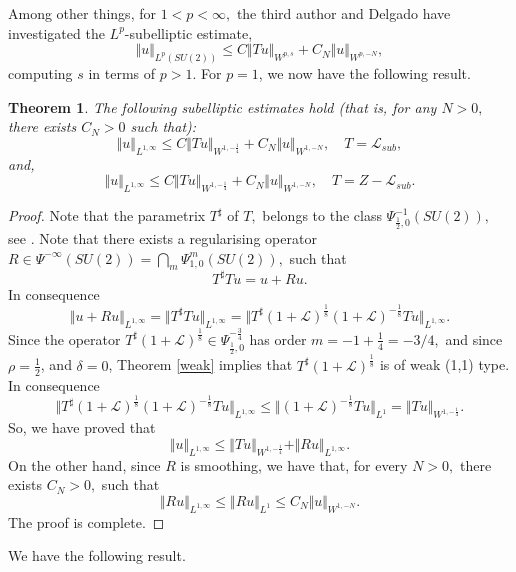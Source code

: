 \documentclass[12pt, reqno]{amsart}
\newtheorem{theorem}{Theorem}[section]
\theoremstyle{definition}
\theoremstyle{remark}
\numberwithin{equation}{section}
\begin{document}
Among other things, for $1<p<\infty,$ the third author and Delgado have investigated  the $L^p$-subelliptic estimate,
\begin{equation}\label{subellipticLp}
    \Vert u\Vert_{L^{p}(SU(2))}\leq C \Vert Tu\Vert_{W^{p,s}}+C_N\Vert u\Vert_{W^{p,-N}},
\end{equation} computing $s$ in terms of $p>1.$ For $p=1$,
 we now have the following result.
\begin{theorem}\label{application}The following subelliptic estimates hold (that is, for any $N>0,$ there exists $C_N>0$ such that):
\begin{equation}
    \Vert u\Vert_{L^{1,\infty}}\leq C \Vert Tu\Vert_{W^{1,-\frac{1}{4}}}+C_N\Vert u\Vert_{W^{1,-N}},\quad  T=\mathcal{L}_{sub},
\end{equation} and,
\begin{equation}
    \Vert u\Vert_{L^{1,\infty}}\leq C \Vert Tu\Vert_{W^{1,-\frac{1}{4}}}+C_N\Vert u\Vert_{W^{1,-N}},\quad  T=Z-\mathcal{L}_{sub}.
\end{equation}
    
\end{theorem}
\begin{proof}
   Note that the parametrix $T^\sharp$ of $T,$ belongs to the class $\Psi^{-1}_{\frac{1}{2},0}(SU(2)),$ see \cite{19}. Note that there exists a regularising operator $R\in \Psi^{-\infty}(SU(2))=\bigcap_m \Psi^{m}_{1,0}(SU(2)),$ such that 
    \begin{equation}
        T^\sharp T u =u+Ru.
    \end{equation} In consequence
    \begin{equation}
        \Vert u+Ru\Vert_{L^{1,\infty}} =\Vert T^\sharp T u\Vert_{L^{1,\infty}}
        = \Vert T^\sharp(1+\mathcal{L})^{\frac{1}{8}} (1+\mathcal{L})^{-\frac{1}{8}}Tu\Vert_{L^{1,\infty}}.
    \end{equation} Since the operator $T^\sharp(1+\mathcal{L})^{  \frac{1}{8}}\in \Psi^{-\frac{3}{4}}_{\frac{1}{2},0}$ has order $m=-1+\frac{1}{4}=-3/4,$ and since $\rho=\frac{1}{2}$, and $\delta=0$, Theorem \ref{weak} implies that $T^\sharp(1+\mathcal{L})^{\frac{1}{8}}$ is of weak (1,1) type. In consequence
    \begin{equation}
        \Vert T^\sharp(1+\mathcal{L})^{\frac{1}{8}} (1+\mathcal{L})^{-\frac{1}{8}}Tu\Vert_{L^{1,\infty}}\leq \Vert  (1+\mathcal{L})^{-\frac{1}{8}}T u\Vert_{L^{1}}=\Vert Tu \Vert_{W^{1,-\frac{1}{4}}}.
    \end{equation} So, we have proved that 
    \begin{equation}
         \Vert u\Vert_{L^{1,\infty}}\leq \Vert Tu \Vert_{W^{1,-\frac{1}{4}}}+  \Vert Ru\Vert_{L^{1,\infty}}.
    \end{equation} On the other hand, since $R$ is smoothing, we have that, for every $N>0,$ there exists $C_N>0,$ such that
    \begin{equation}
        \Vert Ru\Vert_{L^{1,\infty}}\leq \Vert Ru\Vert_{L^{1}}\leq C_N\Vert u\Vert_{W^{1,-N}}.
    \end{equation}The proof is complete.   
\end{proof} We have the following result.
\end{document}
